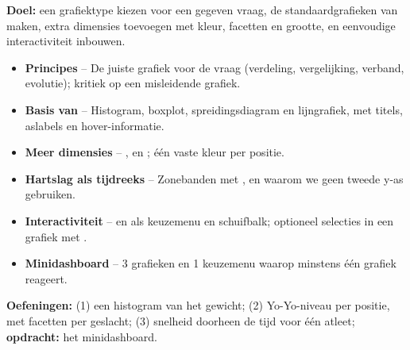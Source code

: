 \textbf{Doel:} een grafiektype kiezen voor een gegeven vraag, de
standaardgrafieken van  maken, extra dimensies
toevoegen met kleur, facetten en grootte, en eenvoudige interactiviteit
inbouwen.

\begin{itemize}
  \item \textbf{Principes} -- De juiste grafiek voor de vraag (verdeling, vergelijking, verband, evolutie); kritiek op een misleidende grafiek.
  \item \textbf{Basis van } -- Histogram, boxplot, spreidingsdiagram en lijngrafiek, met titels, aslabels en hover-informatie.
  \item \textbf{Meer dimensies} -- ,  en ; één vaste kleur per positie.
  \item \textbf{Hartslag als tijdreeks} -- Zonebanden met , en waarom we geen tweede y-as gebruiken.
  \item \textbf{Interactiviteit} --  en  als keuzemenu en schuifbalk; optioneel selecties in een grafiek met .
  \item \textbf{Minidashboard} -- 3 grafieken en 1 keuzemenu waarop minstens één grafiek reageert.
\end{itemize}

\textbf{Oefeningen:} (1) een histogram van het gewicht; (2) Yo-Yo-niveau
per positie, met facetten per geslacht; (3) snelheid doorheen de tijd
voor één atleet; \textbf{opdracht:} het minidashboard.
